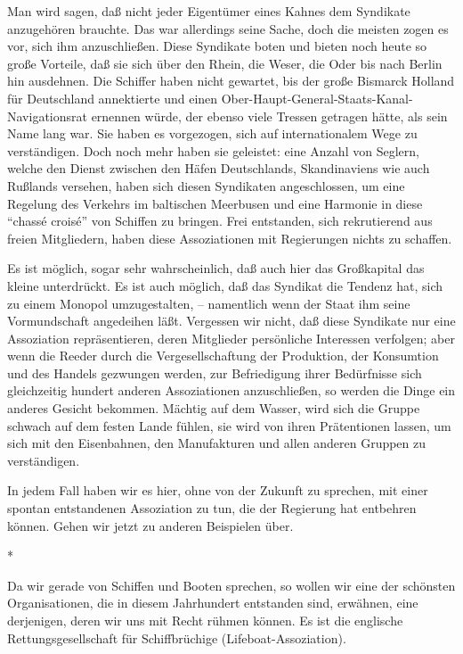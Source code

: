 \documentclass{scrbook}
\begin{document}
Man wird sagen, daß nicht jeder Eigentümer eines Kahnes dem Syndikate anzugehören brauchte. Das war allerdings seine Sache, doch die meisten zogen es vor, sich ihm anzuschließen. Diese Syndikate boten und bieten noch heute so große Vorteile, daß sie sich über den Rhein, die Weser, die Oder bis nach Berlin hin ausdehnen. Die Schiffer haben nicht gewartet, bis der große Bismarck Holland für Deutschland annektierte und einen Ober-Haupt-General-Staats-Kanal-Navigationsrat ernennen würde, der ebenso viele Tressen getragen hätte, als sein Name lang war. Sie haben es vorgezogen, sich auf internationalem Wege zu verständigen. Doch noch mehr haben sie geleistet: eine Anzahl von Seglern, welche den Dienst zwischen den Häfen Deutschlands, Skandinaviens wie auch Rußlands versehen, haben sich diesen Syndikaten angeschlossen, um eine Regelung des Verkehrs im baltischen Meerbusen und eine Harmonie in diese ``chassé croisé'' von Schiffen zu bringen. Frei entstanden, sich rekrutierend aus freien Mitgliedern, haben diese Assoziationen mit Regierungen nichts zu schaffen.

Es ist möglich, sogar sehr wahrscheinlich, daß auch hier das Großkapital das kleine unterdrückt. Es ist auch möglich, daß das Syndikat die Tendenz hat, sich zu einem Monopol umzugestalten, – namentlich wenn der Staat ihm seine Vormundschaft angedeihen läßt. Vergessen wir nicht, daß diese Syndikate nur eine Assoziation repräsentieren, deren Mitglieder persönliche Interessen verfolgen; aber wenn die Reeder durch die Vergesellschaftung der Produktion, der Konsumtion und des Handels gezwungen werden, zur Befriedigung ihrer Bedürfnisse sich gleichzeitig hundert anderen Assoziationen anzuschließen, so werden die Dinge ein anderes Gesicht bekommen. Mächtig auf dem Wasser, wird sich die Gruppe schwach auf dem festen Lande fühlen, sie wird von ihren Prätentionen lassen, um sich mit den Eisenbahnen, den Manufakturen und allen anderen Gruppen zu verständigen.

In jedem Fall haben wir es hier, ohne von der Zukunft zu sprechen, mit einer spontan entstandenen Assoziation zu tun, die der Regierung hat entbehren können. Gehen wir jetzt zu anderen Beispielen über.

\begin{center}*\end{center}

Da wir gerade von Schiffen und Booten sprechen, so wollen wir eine der schönsten Organisationen, die in diesem Jahrhundert entstanden sind, erwähnen, eine derjenigen, deren wir uns mit Recht rühmen können. Es ist die englische Rettungsgesellschaft für Schiffbrüchige (Lifeboat-Assoziation).
\end{document}
